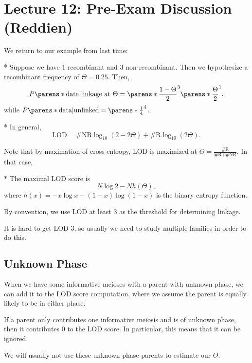 \section*{Lecture 12: Pre-Exam Discussion (Reddien)}
\setcounter{section}{12}

We return to our example from last time:

\begin{exm}*
	Suppose we have 1 recombinant and 3 non-recombinant. Then we hypothesize a recombinant frequency of $\Theta = 0.25$.
	Then, \[
		P\parens*{\text{data} | \text{linkage at }\Theta} = \parens*{\frac{1-\Theta}{2}}^3 \parens*{\frac{\Theta}2}^1,
	\]
	while $P\parens*{\text{data} | \text{unlinked}} = \parens*{\frac 14}^4$.
\end{exm}

\begin{fact}*
	In general, \[
		\text{LOD} = \text{\# NR} \log_{10}(2-2\Theta) + \text{\# R} \log_{10} (2\Theta).
	\]
\end{fact}

Note that by maximation of cross-entropy, LOD is maximized at $\Theta = \frac{\text{\# R}}{\text{\# R} + \text{\# NR}}$.
In that case, 

\begin{fact}*
	The maximal LOD score is \[
		N\log 2 - N h(\Theta),
	\]where $h(x) = -x\log x - (1-x) \log(1-x)$ is the binary entropy function.
\end{fact}

\begin{defn}
	By convention, we use LOD at least 3 as the threshold for determining linkage.
\end{defn}

It is hard to get LOD 3, so usually we need to study multiple families in order to do this.

\subsection{Unknown Phase}

When we have some informative meioses with a parent with unknown phase, we can add it to the LOD score computation, where we assume the parent is equally likely to be in either phase.

\begin{fact}
	If a parent only contributes one informative meiosis and is of unknown phase, then it contributes $0$ to the LOD score. In particular, this means that it can be ignored.
\end{fact}

We will usually not use these unknown-phase parents to estimate our $\Theta$.
